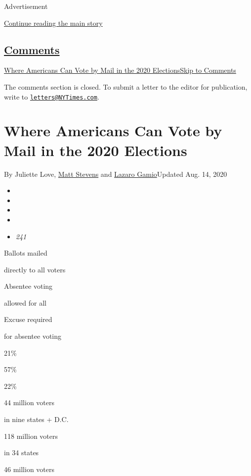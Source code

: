 Advertisement

\protect\hyperlink{after-top}{Continue reading the main story}

\hypertarget{comments}{%
\subsection{\texorpdfstring{\protect\hyperlink{commentsContainer}{Comments}}{Comments}}\label{comments}}

\href{}{Where Americans Can Vote by Mail in the 2020
Elections}\href{}{Skip to Comments}

The comments section is closed. To submit a letter to the editor for
publication, write to
\href{mailto:letters@NYTimes.com}{\nolinkurl{letters@NYTimes.com}}.

\hypertarget{where-americans-can-vote-by-mail-in-the-2020-elections}{%
\section{Where Americans Can Vote by Mail in the 2020
Elections}\label{where-americans-can-vote-by-mail-in-the-2020-elections}}

By Juliette Love,
\href{https://www.nytimes3xbfgragh.onion/by/matt-stevens}{Matt Stevens}
and \href{https://www.nytimes3xbfgragh.onion/by/lazaro-gamio}{Lazaro
Gamio}Updated Aug. 14, 2020

\begin{itemize}
\item
\item
\item
\item
\item
  \emph{241}
\end{itemize}

Ballots mailed

directly to all voters

Absentee voting

allowed for all

Excuse required

for absentee voting

21\%

57\%

22\%

44 million voters

in nine states + D.C.

118 million voters

in 34 states

46 million voters

